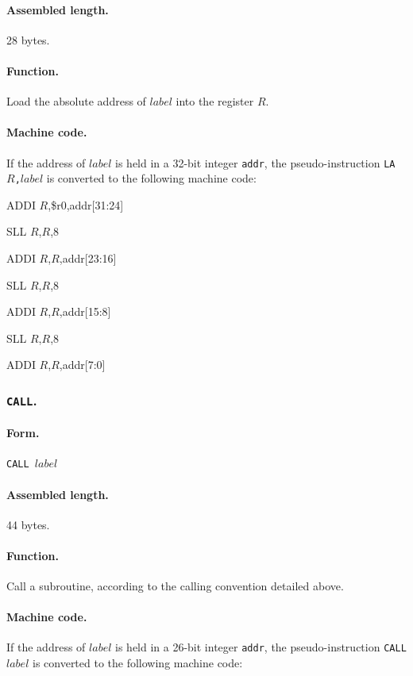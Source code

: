 \documentclass[12pt,english,twoside]{report}
\def\code{\texttt}
\newenvironment{codeblock}
{\begin{list}{}{
\setlength{\rightmargin}{\leftmargin}
\setlength{\listparindent}{0pt}%
\raggedright
\setlength{\itemsep}{0pt}
\setlength{\parsep}{0pt}
\normalfont\ttfamily}%
 \item[]}
{\end{list}}
\begin{document}
\paragraph{Assembled length.} 28 bytes.

\paragraph{Function.} Load the absolute address of $\mathit{label}$ into
the register $R$.

\paragraph{Machine code.}
If the address of $\mathit{label}$ is held in a 32-bit integer
\code{addr}, the pseudo-instruction \code{LA $R$,$\mathit{label}$} is
converted to the following machine code:

\begin{codeblock}
  ADDI $R$,\$r0,addr[31:24]
  
  SLL $R$,$R$,8

  ADDI $R$,$R$,addr[23:16]

  SLL $R$,$R$,8

  ADDI $R$,$R$,addr[15:8]

  SLL $R$,$R$,8

  ADDI $R$,$R$,addr[7:0]
\end{codeblock}

\subsubsection*{\label{Asm_CALL} \code{CALL}.}
\paragraph{Form.} \code{CALL $\mathit{label}$}

\paragraph{Assembled length.} 44 bytes.

\paragraph{Function.} Call a subroutine, according to the calling convention detailed above.

\paragraph{Machine code.}
If the address of $\mathit{label}$ is held in a 26-bit integer
\code{addr}, the pseudo-instruction \code{CALL $\mathit{label}$} is
converted to the following machine code:
\end{document}
